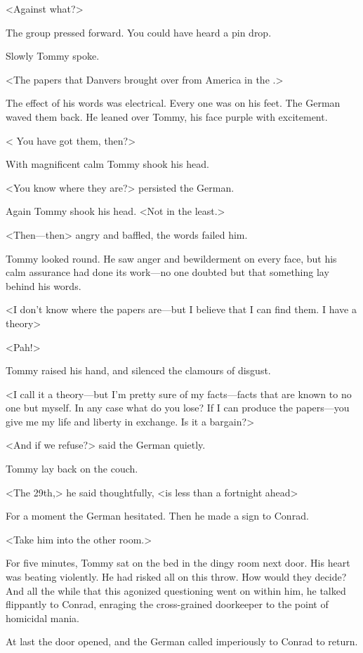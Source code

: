 <Against what?>

The group pressed forward. You could have heard a pin drop.

Slowly Tommy spoke.

<The papers that Danvers brought over from America in the .>

The effect of his words was electrical. Every one was on his feet. The German waved them back. He leaned over Tommy, his face purple with excitement.

< You have got them, then?>

With magnificent calm Tommy shook his head.

<You know where they are?> persisted the German.

Again Tommy shook his head. <Not in the least.>

<Then—then\longdash> angry and baffled, the words failed him.

Tommy looked round. He saw anger and bewilderment on every face, but his calm assurance had done its work—no one doubted but that something lay behind his words.

<I don't know where the papers are—but I believe that I can find them. I have a theory\longdash>

<Pah!>

Tommy raised his hand, and silenced the clamours of disgust.

<I call it a theory—but I'm pretty sure of my facts—facts that are known to no one but myself. In any case what do you lose? If I can produce the papers—you give me my life and liberty in exchange. Is it a bargain?>

<And if we refuse?> said the German quietly.

Tommy lay back on the couch.

<The 29th,> he said thoughtfully, <is less than a fortnight ahead\longdash>

For a moment the German hesitated. Then he made a sign to Conrad.

<Take him into the other room.>

For five minutes, Tommy sat on the bed in the dingy room next door. His heart was beating violently. He had risked all on this throw. How would they decide? And all the while that this agonized questioning went on within him, he talked flippantly to Conrad, enraging the cross-grained doorkeeper to the point of homicidal mania.

At last the door opened, and the German called imperiously to Conrad to return.

